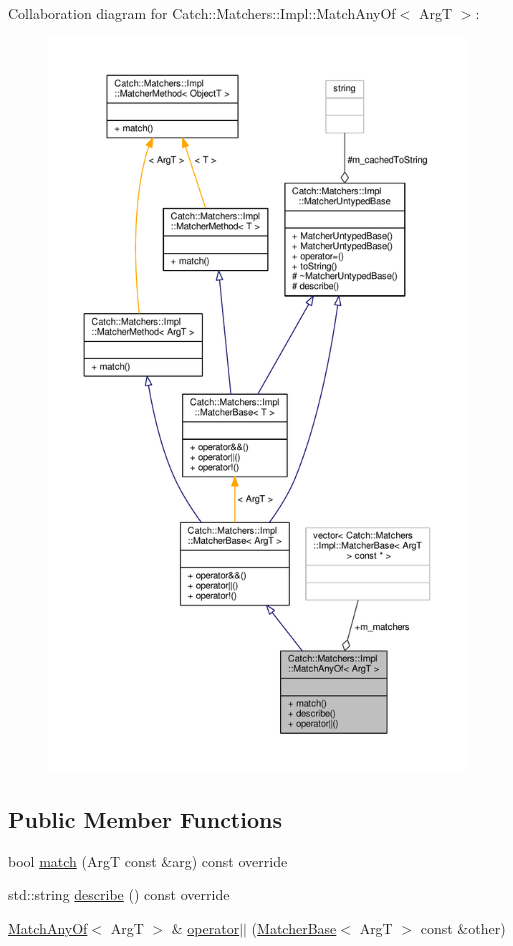 Collaboration diagram for Catch\-:\-:Matchers\-:\-:Impl\-:\-:Match\-Any\-Of$<$ Arg\-T $>$\-:
\nopagebreak
\begin{figure}[H]
\begin{center}
\leavevmode
\includegraphics[height=550pt]{struct_catch_1_1_matchers_1_1_impl_1_1_match_any_of__coll__graph}
\end{center}
\end{figure}
\subsection*{Public Member Functions}
\begin{DoxyCompactItemize}
\item 
bool \hyperlink{struct_catch_1_1_matchers_1_1_impl_1_1_match_any_of_a8a3e8338f979e56277dcf553efb78dc0}{match} (Arg\-T const \&arg) const override
\item 
std\-::string \hyperlink{struct_catch_1_1_matchers_1_1_impl_1_1_match_any_of_a315285204df93d1f8e72f50dd66eb709}{describe} () const override
\item 
\hyperlink{struct_catch_1_1_matchers_1_1_impl_1_1_match_any_of}{Match\-Any\-Of}$<$ Arg\-T $>$ \& \hyperlink{struct_catch_1_1_matchers_1_1_impl_1_1_match_any_of_a44d7582dbe09fc31b9a5ba8a6367b506}{operator$\vert$$\vert$} (\hyperlink{struct_catch_1_1_matchers_1_1_impl_1_1_matcher_base}{Matcher\-Base}$<$ Arg\-T $>$ const \&other)
\end{DoxyCompactItemize}
